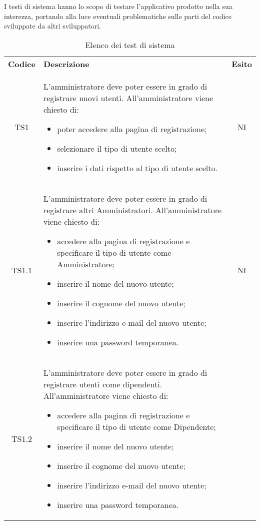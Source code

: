 I testi di sistema hanno lo scopo di testare l’applicativo prodotto nella sua interezza, portando alla luce eventuali problematiche sulle parti del codice sviluppate da altri sviluppatori.
{
    \renewcommand{\arraystretch}{1.5}
    \centering
    \begin{longtable}{ c C{11cm} c }
        \caption{Elenco dei test di sistema}\\
        \rowcolor{\primaryColor}
        \textcolor{\secondaryColor}{
        \textbf{Codice}}     & \textcolor{\secondaryColor}
        {\textbf{Descrizione}} & \textcolor{\secondaryColor}{\textbf{Esito}} \\

        TS1&
        L'amministratore deve poter essere in grado di registrare nuovi utenti.\newline
        All'amministratore viene chiesto di:
        \begin{itemize}
            \item poter accedere alla pagina di registrazione;
            \item selezionare il tipo di utente scelto;
            \item inserire i dati rispetto al tipo di utente scelto.
            
        \end{itemize}&
        NI\\

      TS1.1&
        L'amministratore deve poter essere in grado di registrare altri Amministratori.\newline
        All'amministratore viene chiesto di:
        \begin{itemize}
            \item accedere alla pagina di registrazione e specificare il tipo di utente come Amministratore;
            \item inserire il nome del nuovo utente;
            \item inserire il cognome del nuovo utente;
            \item inserire l'indirizzo e-mail del nuovo utente;
            \item inserire una password temporanea.
            
        \end{itemize}&
        NI\\

        TS1.2&
        L'amministratore deve poter essere in grado di registrare utenti come dipendenti.\newline
        All'amministratore viene chiesto di:
        \begin{itemize}
            \item accedere alla pagina di registrazione e specificare il tipo di utente come Dipendente;
            \item inserire il nome del nuovo utente;
            \item inserire il cognome del nuovo utente;
            \item inserire l'indirizzo e-mail del nuovo utente;
            \item inserire una password temporanea.
            

\end{itemize}
\end{longtable}}
